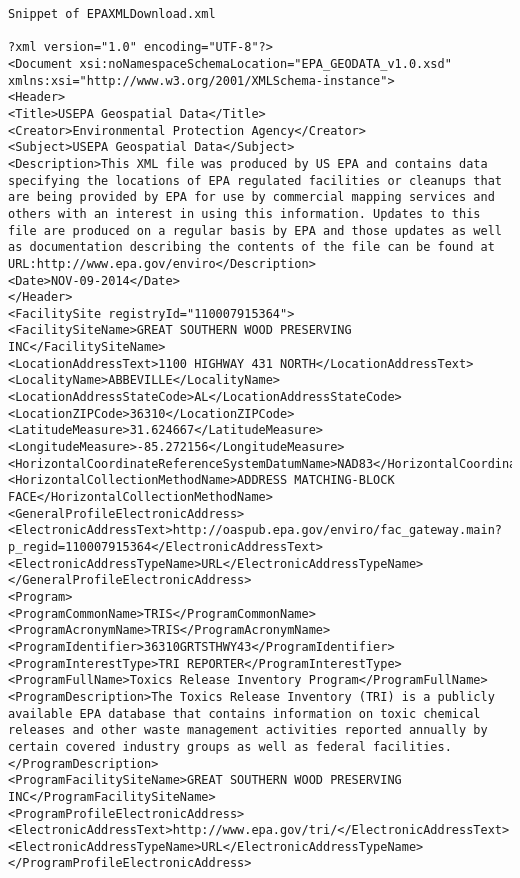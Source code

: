 \documentclass[11pt,english]{article}
\begin{document}
\begin{lstlisting}
Snippet of EPAXMLDownload.xml

?xml version="1.0" encoding="UTF-8"?>
<Document xsi:noNamespaceSchemaLocation="EPA_GEODATA_v1.0.xsd" xmlns:xsi="http://www.w3.org/2001/XMLSchema-instance">
<Header>
<Title>USEPA Geospatial Data</Title>
<Creator>Environmental Protection Agency</Creator>
<Subject>USEPA Geospatial Data</Subject>
<Description>This XML file was produced by US EPA and contains data specifying the locations of EPA regulated facilities or cleanups that are being provided by EPA for use by commercial mapping services and others with an interest in using this information. Updates to this file are produced on a regular basis by EPA and those updates as well as documentation describing the contents of the file can be found at URL:http://www.epa.gov/enviro</Description>
<Date>NOV-09-2014</Date>
</Header>
<FacilitySite registryId="110007915364">
<FacilitySiteName>GREAT SOUTHERN WOOD PRESERVING INC</FacilitySiteName>
<LocationAddressText>1100 HIGHWAY 431 NORTH</LocationAddressText>
<LocalityName>ABBEVILLE</LocalityName>
<LocationAddressStateCode>AL</LocationAddressStateCode>
<LocationZIPCode>36310</LocationZIPCode>
<LatitudeMeasure>31.624667</LatitudeMeasure>
<LongitudeMeasure>-85.272156</LongitudeMeasure>
<HorizontalCoordinateReferenceSystemDatumName>NAD83</HorizontalCoordinateReferenceSystemDatumName>
<HorizontalCollectionMethodName>ADDRESS MATCHING-BLOCK FACE</HorizontalCollectionMethodName>
<GeneralProfileElectronicAddress>
<ElectronicAddressText>http://oaspub.epa.gov/enviro/fac_gateway.main?p_regid=110007915364</ElectronicAddressText>
<ElectronicAddressTypeName>URL</ElectronicAddressTypeName>
</GeneralProfileElectronicAddress>
<Program>
<ProgramCommonName>TRIS</ProgramCommonName>
<ProgramAcronymName>TRIS</ProgramAcronymName>
<ProgramIdentifier>36310GRTSTHWY43</ProgramIdentifier>
<ProgramInterestType>TRI REPORTER</ProgramInterestType>
<ProgramFullName>Toxics Release Inventory Program</ProgramFullName>
<ProgramDescription>The Toxics Release Inventory (TRI) is a publicly available EPA database that contains information on toxic chemical releases and other waste management activities reported annually by certain covered industry groups as well as federal facilities.</ProgramDescription>
<ProgramFacilitySiteName>GREAT SOUTHERN WOOD PRESERVING INC</ProgramFacilitySiteName>
<ProgramProfileElectronicAddress>
<ElectronicAddressText>http://www.epa.gov/tri/</ElectronicAddressText>
<ElectronicAddressTypeName>URL</ElectronicAddressTypeName>
</ProgramProfileElectronicAddress>

\end{lstlisting}
\end{document}

